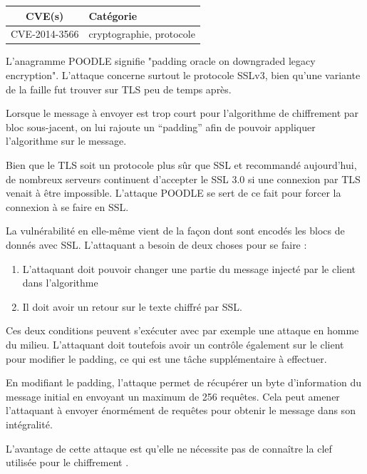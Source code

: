 \begin{tabularx}{0.96\textwidth}{|c|X|}
  \hline
  \textbf{CVE(s)} & \textbf{Catégorie} \\
  \hline
  CVE-2014-3566 & cryptographie, protocole \\
  \hline
\end{tabularx}

\vspace{1em}

L'anagramme POODLE signifie "padding oracle on downgraded legacy encryption". L'attaque concerne surtout le protocole SSLv3, bien qu'une variante de la faille fut trouver sur TLS peu de temps après.

Lorsque le message à envoyer est trop court pour l'algorithme de chiffrement par bloc sous-jacent, on lui rajoute un ``padding'' afin de pouvoir appliquer l'algorithme sur le message.

Bien que le TLS soit un protocole plus sûr que SSL et recommandé aujourd'hui, de nombreux serveurs continuent d'accepter le SSL 3.0 si une connexion par TLS venait à être impossible. L'attaque POODLE se sert de ce fait pour forcer la connexion à se faire en SSL.

La vulnérabilité en elle-même vient de la façon dont sont encodés les blocs de donnés avec SSL. L'attaquant a besoin de deux choses pour se faire :

\begin{enumerate}
    \item L'attaquant doit pouvoir changer une partie du message injecté par le client dans l'algorithme
    \item Il doit avoir un retour sur le texte chiffré par SSL.
\end{enumerate}

Ces deux conditions peuvent s'exécuter avec par exemple une attaque en homme du milieu. L'attaquant doit toutefois avoir un contrôle également sur le client pour modifier le padding, ce qui est une tâche supplémentaire à effectuer.

En modifiant le padding, l'attaque permet de récupérer un byte d'information du message initial en envoyant un maximum de 256 requêtes. Cela peut amener l'attaquant à envoyer énormément de requêtes pour obtenir le message dans son intégralité.

L'avantage de cette attaque est qu'elle ne nécessite pas de connaître la clef utilisée pour le chiffrement \cite{poodle}.



